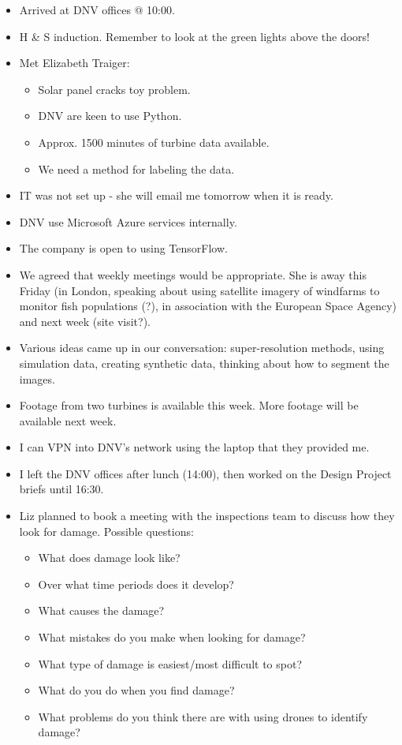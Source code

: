 \documentclass[idxtotoc,hyperref,openany]{labbook} %
\begin{document}
\begin{itemize}
\item Arrived at DNV offices @ 10:00.
\item H \& S induction. Remember to look at the green lights above the doors!
\item Met Elizabeth Traiger:
\begin{itemize}
\item Solar panel cracks toy problem.
\item DNV are keen to use Python.
\item Approx. 1500 minutes of turbine data available.
\item We need a method for labeling the data.
\end{itemize} 
\item IT was not set up - she will email me tomorrow when it is ready.
\item DNV use Microsoft Azure services internally.
\item The company is open to using TensorFlow.
\item We agreed that weekly meetings would be appropriate. She is away this Friday (in London, speaking about using satellite imagery of windfarms to monitor fish populations (?), in association with the European Space Agency) and next week (site visit?).
\item Various ideas came up in our conversation: super-resolution methods, using simulation data, creating synthetic data, thinking about how to segment the images.
\item Footage from two turbines is available this week. More footage will be available next week.
\item I can VPN into DNV's network using the laptop that they provided me.
\item I left the DNV offices after lunch (14:00), then worked on the Design Project briefs until 16:30.
\item Liz planned to book a meeting with the inspections team to discuss how they look for damage. Possible questions:
\begin{itemize}
	\item What does damage look like?
	\item Over what time periods does it develop?
	\item What causes the damage?
	\item What mistakes do you make when looking for damage?
	\item What type of damage is easiest/most difficult to spot?
	\item What do you do when you find damage?
	\item What problems do you think there are with using drones to identify damage?
\end{itemize}
\end{itemize}
\end{document}
